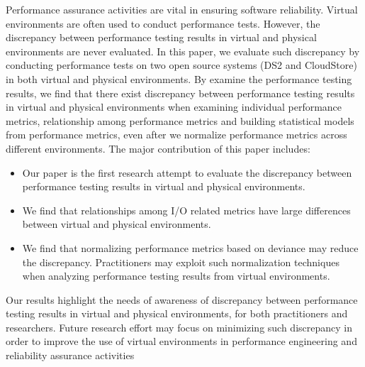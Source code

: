 Performance assurance activities are vital in ensuring software reliability. Virtual environments are often used to conduct performance tests. However, the discrepancy between performance testing results in virtual and physical environments are never evaluated. In this paper, we evaluate such discrepancy by conducting performance tests on two open source systems (DS2 and CloudStore) in both virtual and physical environments. By examine the performance testing results, we find that there exist discrepancy between performance testing results in virtual and physical environments when examining individual performance metrics, relationship among performance metrics and building statistical models from performance metrics, even after we normalize performance metrics across different environments. The major contribution of this paper includes: 
\begin{itemize} \itemsep -0.8pt 
	\item Our paper is the first research attempt to evaluate the discrepancy between performance testing results in virtual and physical environments.
	\item We find that relationships among I/O related metrics have large differences between virtual and physical environments.
	\item We find that normalizing performance metrics based on deviance may reduce the discrepancy. Practitioners may exploit such normalization techniques when analyzing performance testing results from virtual environments.
\end{itemize}
Our results highlight the needs of awareness of discrepancy between performance testing results in virtual and physical environments, for both practitioners and researchers. Future research effort may focus on minimizing such discrepancy in order to improve the use of virtual environments in performance engineering and reliability assurance activities



